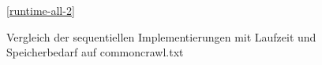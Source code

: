 \begin{figure}[ht]
    \medskip
    \ref{runtime-all-2}
    \caption{Vergleich der sequentiellen Implementierungen mit Laufzeit und Speicherbedarf auf commoncrawl.txt}
\end{figure}
\FloatBarrier



%
%
